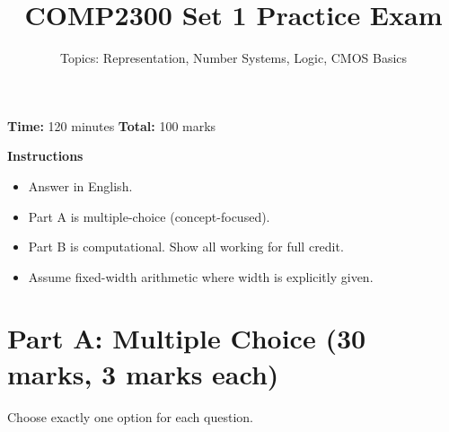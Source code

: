\documentclass[11pt]{article}
\title{COMP2300 Set 1 Practice Exam}
\author{Topics: Representation, Number Systems, Logic, CMOS Basics}
\date{}
\begin{document}
\maketitle

\noindent\textbf{Time:} 120 minutes \hfill
\textbf{Total:} 100 marks

\vspace{0.5em}
\noindent\textbf{Instructions}
\begin{itemize}[leftmargin=1.5em]
  \item Answer in English.
  \item Part A is multiple-choice (concept-focused).
  \item Part B is computational. Show all working for full credit.
  \item Assume fixed-width arithmetic where width is explicitly given.
\end{itemize}

\section*{Part A: Multiple Choice (30 marks, 3 marks each)}
Choose exactly one option for each question.
\end{document}
